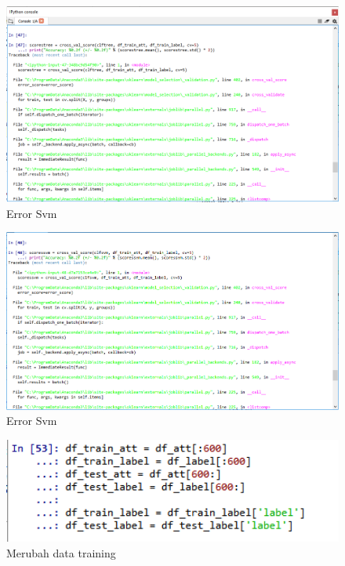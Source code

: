 \begin{figure}[ht]
      \centerline{\includegraphics[width=1\textwidth]
      {figures/cokro/c51}}
      \caption{Error Svm}
      \label{c51}
      \end{figure}

\begin{figure}[ht]
      \centerline{\includegraphics[width=1\textwidth]
      {figures/cokro/c52}}
      \caption{Error Svm}
      \label{c52}
      \end{figure}

\begin{figure}[ht]
      \centerline{\includegraphics[width=1\textwidth]
      {figures/cokro/c53}}
      \caption{Merubah data training}
      \label{c53}
      \end{figure}

